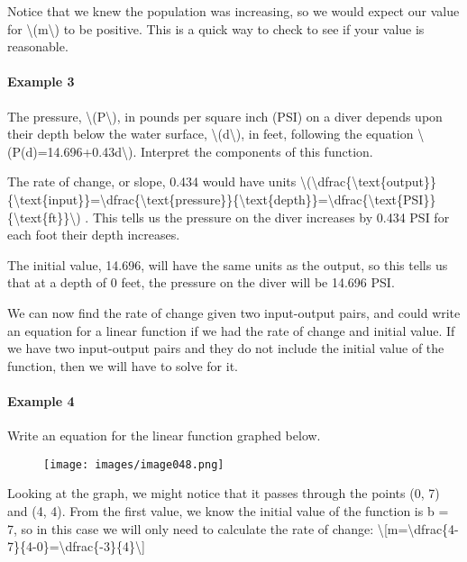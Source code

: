 Notice that we knew the population was increasing, so we would expect
our value for \textbackslash{}(m\textbackslash{}) to be positive. This
is a quick way to check to see if your value is reasonable.

\hypertarget{example-3}{%
\paragraph{Example 3}\label{example-3}}

The pressure, \textbackslash{}(P\textbackslash{}), in pounds per square
inch (PSI) on a diver depends upon their depth below the water surface,
\textbackslash{}(d\textbackslash{}), in feet, following the equation
\textbackslash{}(P(d)=14.696+0.43d\textbackslash{}). Interpret the
components of this function.

The rate of change, or slope, 0.434 would have units
\textbackslash{}(\textbackslash{}dfrac\{\textbackslash{}text\{output\}\}\{\textbackslash{}text\{input\}\}=\textbackslash{}dfrac\{\textbackslash{}text\{pressure\}\}\{\textbackslash{}text\{depth\}\}=\textbackslash{}dfrac\{\textbackslash{}text\{PSI\}\}\{\textbackslash{}text\{ft\}\}\textbackslash{})
. This tells us the pressure on the diver increases by 0.434 PSI for
each foot their depth increases.

The initial value, 14.696, will have the same units as the output, so
this tells us that at a depth of 0 feet, the pressure on the diver will
be 14.696 PSI.

We can now find the rate of change given two input-output pairs, and
could write an equation for a linear function if we had the rate of
change and initial value. If we have two input-output pairs and they do
not include the initial value of the function, then we will have to
solve for it.

\hypertarget{example-4}{%
\paragraph{Example 4}\label{example-4}}

Write an equation for the linear function graphed below.

\begin{figure}
\centering
\texttt{[image: images/image048.png]}
\caption{}
\end{figure}

Looking at the graph, we might notice that it passes through the points
(0, 7) and (4, 4). From the first value, we know the initial value of
the function is b = 7, so in this case we will only need to calculate
the rate of change:
\textbackslash{}{[}m=\textbackslash{}dfrac\{4-7\}\{4-0\}=\textbackslash{}dfrac\{-3\}\{4\}\textbackslash{}{]}

